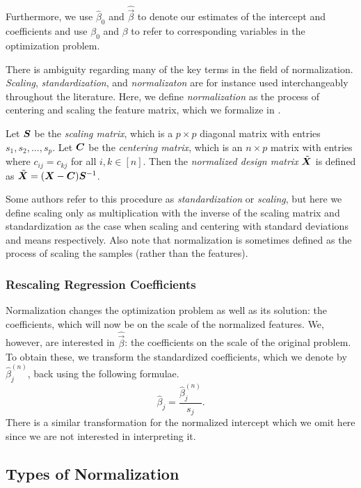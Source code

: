 Furthermore, we use \(\hat\beta_0\) and \(\hat{\vec{\beta}}\) to denote our estimates of the intercept and coefficients and use \(\beta_0\) and \(\beta\) to refer to corresponding variables in the optimization problem.


There is ambiguity regarding many of the key terms in the field of normalization. \emph{Scaling}, \emph{standardization}, and \emph{normalizaton} are for instance used interchangeably throughout the literature. Here, we define \emph{normalization} as the process of centering and scaling the feature matrix, which we formalize in .

\begin{definition}[Normalization]
  \label{def:normalization}
  Let \(\mat S\) be the \emph{scaling matrix}, which is a \(p \times p\) diagonal matrix with entries \(s_1, s_2, \dots, s_p\). Let \(\mat C\) be the \emph{centering matrix}, which is an \(n \times p\) matrix with entries where \(c_{ij} = c_{kj}\) for all \(i,k \in [n]\). Then the \emph{normalized design matrix} \(\tilde{\mat X}\) is defined as \(\tilde{\mat X} = (\mat X - \mat C)\mat S^{-1}\).
\end{definition}

Some authors refer to this procedure as \emph{standardization} or \emph{scaling}, but here we define scaling only as multiplication with the inverse of the scaling matrix and standardization as the case when scaling and centering with standard deviations and means respectively. Also note that normalization is sometimes defined as the process of scaling the samples (rather than the features).

\subsubsection{Rescaling Regression Coefficients}

Normalization changes the optimization problem as well as its solution: the coefficients, which will now be on the scale of the normalized features. We, however, are interested in \(\hat{\vec{\beta}}\): the coefficients on the scale of the original problem. To obtain these, we transform the standardized coefficients, which we denote by \(\hat\beta^{(n)}_j\), back using the following formulae.
\[
  \hat\beta_j = \frac{\hat\beta^{(n)}_j}{s_j}.
\]
There is a similar transformation for the normalized intercept which we omit here since we are not interested in interpreting it.

\subsection{Types of Normalization}

